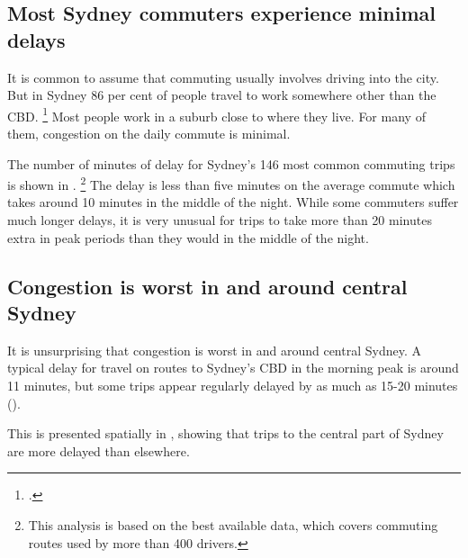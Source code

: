 \documentclass{grattan}
\begin{document}
\subsection{Most Sydney commuters experience minimal delays}

It is common to assume that commuting usually involves driving into the city.
But in Sydney 86 per cent of people travel to work somewhere other than the CBD\@.
\footcite{ABS2011Census}
Most people work in a suburb close to where they live. %
For many of them, congestion on the daily commute is minimal.

The number of minutes of delay for Sydney's 146 most common commuting trips is shown in .%
    \footnote{This analysis is based on the best available data, which covers commuting routes used by more than 400 drivers.}
The delay is less than five minutes on the average commute which takes around 10 minutes in the middle of the night.
While some commuters suffer much longer delays, it is very unusual for trips to take more than 20 minutes extra in peak periods than they would in the middle of the night.


\subsection{Congestion is worst in and around central Sydney}\label{subsec:worst-around-central-sydney}

It is unsurprising that congestion is worst in and around central Sydney. A typical delay for travel on routes to Sydney's CBD in the morning peak is around 11 minutes, but some trips appear regularly delayed by as much as 15-20 minutes ().

This is presented spatially in , showing that trips to the central part of Sydney are more delayed than elsewhere.
\end{document}
